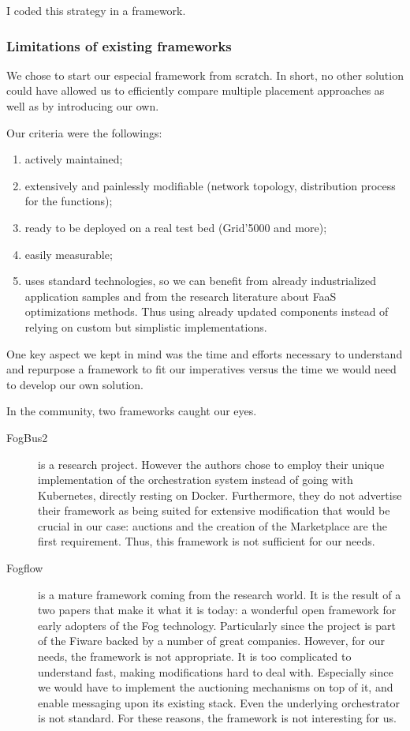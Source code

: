 I coded this strategy in a framework.

\subsubsection{Limitations of existing frameworks}

We chose to start our especial framework from scratch. In short, no other solution could have allowed us to efficiently compare multiple placement approaches as well as by introducing our own.

Our criteria were the followings: 
\begin{enumerate}[(1)]
	\item actively maintained;
	\item extensively and painlessly modifiable (network topology, distribution process for the functions);
	\item ready to be deployed on a real test bed (Grid'5000 and more);
	\item easily measurable;
	\item uses standard technologies, so we can benefit from already industrialized application samples and from the research literature about \gls{FaaS} optimizations methods. Thus using already updated components instead of relying on custom but simplistic implementations.
\end{enumerate}


One key aspect we kept in mind was the time and efforts necessary to understand and repurpose a framework to fit our imperatives versus the time we would need to develop our own solution.

In the community, two frameworks caught our eyes.
\begin{description}
	\item[FogBus2 \cite{deng_fogbus2_2021}]{is a research project. However the authors chose to employ their unique implementation of the orchestration system instead of going with Kubernetes, directly resting on Docker. Furthermore, they do not advertise their framework as being suited for extensive modification that would be crucial in our case: auctions and the creation of the Marketplace are the first requirement. Thus, this framework is not sufficient for our needs.
	      }
	\item[Fogflow \cite{smartfog_fogflow_2022}]{ is a mature framework coming from the research world. It is the result of a two papers \cite{cheng_fogflow_2018, cheng_fog_2019} that make it what it is today: a wonderful open framework for early adopters of the Fog technology. Particularly since the project is part of the Fiware \cite{fiware_foundation_fiware_2021} backed by a number of great companies. However, for our needs, the framework is not appropriate. It is too complicated to understand fast, making modifications hard to deal with. Especially since we would have to implement the auctioning mechanisms on top of it, and enable messaging upon its existing stack. Even the underlying orchestrator is not standard. For these reasons, the framework is not interesting for us.}
\end{description}

